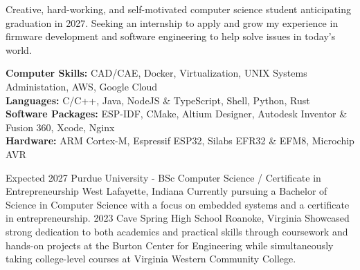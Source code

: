 \documentclass[9pt]{developercv} %
\begin{document}
\vspace{0.3cm}



\begin{minipage}[t]{1\textwidth} %
	\vspace{-\baselineskip} %
	Creative, hard-working, and self-motivated computer science student anticipating graduation in 2027. Seeking an internship to apply and grow my experience in firmware development and software engineering to help solve issues in today's world.
\end{minipage}

\vspace{0.3cm}


\begin{minipage}[t]{1\textwidth} %
	\vspace{-\baselineskip} %
	\textbf{Computer Skills:} CAD/CAE, Docker, Virtualization, UNIX Systems Administation, AWS, Google Cloud\\
	\textbf{Languages:} C/C++, Java, NodeJS \& TypeScript, Shell, Python, Rust\\
	\textbf{Software Packages:} ESP-IDF, CMake, Altium Designer, Autodesk Inventor \& Fusion 360, Xcode, Nginx\\
	\textbf{Hardware:} ARM Cortex-M, Espressif ESP32, Silabs EFR32 \& EFM8, Microchip AVR\\
\end{minipage}

\vspace{0.3cm}



\begin{entrylist}
	\entry
		{Expected 2027}
		{Purdue University - BSc Computer Science / Certificate in Entrepreneurship}
		{West Lafayette, Indiana}
		{Currently pursuing a Bachelor of Science in Computer Science with a focus on embedded systems and a certificate in entrepreneurship.}
	\entry
		{2023}
		{Cave Spring High School}
		{Roanoke, Virginia}
		{Showcased strong dedication to both academics and practical skills through coursework and hands-on projects at the Burton Center for Engineering while simultaneously taking college-level courses at Virginia Western Community College.}
\end{entrylist}
\end{document}
